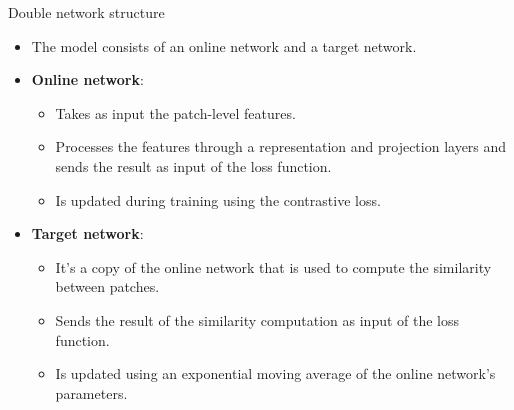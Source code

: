 \documentclass{beamer}
\begin{document}
  \begin{frame}{Double network structure}
      \begin{itemize}
              \item The model consists of  an online network and a target network.
              \item \textbf{Online network}:
                  \begin{itemize}
                          \item Takes as input the patch-level features.
                          \item Processes the features through a representation and projection
                           layers and sends the result as input of the loss function.
                          \item Is updated during training using the contrastive loss.
                          
                          
                          \end{itemize}
                  \item \textbf{Target network}:
                          \begin{itemize}
                                \item It's a copy of the online network that is used to compute the similarity between patches.
                                \item Sends the result of the similarity computation as input of the loss function.
                                \item Is updated using an exponential moving average of the online network's parameters.
                                \end{itemize}

                  \end{itemize}
      \end{frame}
\end{document}
